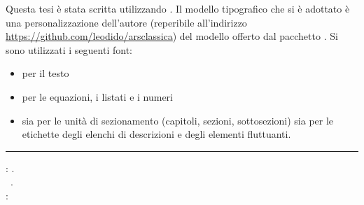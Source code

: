
\clearpage
{}
\thispagestyle{empty}

\hfill

\vfill

\noindent
Questa tesi è stata scritta utilizzando \ctLaTeX{}.
Il modello tipografico che si è adottato è una personalizzazione dell'autore (reperibile all'indirizzo \url{https://github.com/leodido/arsclassica}) del modello offerto dal pacchetto \href{http://www.ctan.org/tex-archive/macros/latex/contrib/arsclassica}{\arsclassica{}}.
Si sono utilizzati i seguenti font:
\begin{itemize}
	\item {} per il testo
	\item {}\rmfamily{} per le equazioni, i listati e i numeri
	\item {}\rmfamily{} sia per le unità di sezionamento (capitoli, sezioni, sottosezioni) sia per le etichette degli elenchi di descrizioni e degli elementi fluttuanti.
\end{itemize}

\vspace{.2cm}
\hrule
\bigskip

\noindent\myname: \textit{\mytitle}. \\
\mydegree \hspace{1px} \textcopyright\ \MakeTextLowercase{\mytime}. \\

\medskip
{}: \\
 \\
